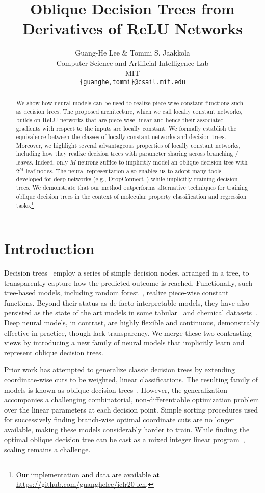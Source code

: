 \documentclass{article} \usepackage{iclr2020_conference,times}
\title{Oblique Decision Trees from Derivatives of ReLU Networks}
\author{Guang-He Lee \& Tommi S. Jaakkola \\
Computer Science and Artificial Intelligence Lab\\
MIT\\
\texttt{\{guanghe,tommi\}@csail.mit.edu} \\
}
\newcommand{\camera}[1]{\textcolor{black}{#1}}
\begin{document}
\maketitle

\begin{abstract}
We show how neural models can be used to realize piece-wise constant functions such as decision trees. The proposed architecture, which we call locally constant networks, builds on ReLU networks that are piece-wise linear and hence their associated gradients with respect to the inputs are locally constant. We formally establish the equivalence between the classes of locally constant networks and decision trees. Moreover, we highlight several advantageous properties of locally constant networks, including how they realize decision trees with parameter sharing across branching / leaves. Indeed, only $M$ neurons suffice to implicitly model an oblique decision tree with $2^M$ leaf nodes. The neural representation also enables us to adopt many tools developed for deep networks (e.g., DropConnect~\citep{wan2013regularization}) while implicitly training decision trees. We demonstrate that our method outperforms alternative techniques for training oblique decision trees in the context of molecular property classification and regression tasks.\footnote{\camera{Our implementation and data are available at \url{https://github.com/guanghelee/iclr20-lcn}.}}
\end{abstract}

%
 \section{Introduction}

Decision trees~\citep{cart84} employ a series of simple decision nodes, arranged in a tree, to transparently capture how the predicted outcome is reached. Functionally, such tree-based models, including random forest~\citep{breiman2001random}, realize piece-wise constant functions. Beyond their status as de facto interpretable models, they have also persisted as the state of the art models in some tabular~\citep{sandulescu2016predicting} and chemical datasets~\citep{wu2018moleculenet}. Deep neural models, in contrast, are highly flexible and continuous, demonstrably effective in practice, though lack transparency. We merge these two contrasting views by introducing a new family of neural models that implicitly learn and represent oblique decision trees. 

Prior work has attempted to generalize classic decision trees by extending coordinate-wise cuts to be weighted, linear classifications. The resulting family of models is known as oblique decision trees~\citep{murthy1993oc1}. However, the generalization accompanies a challenging combinatorial, non-differentiable optimization problem over the linear parameters at each decision point. Simple sorting procedures used for successively finding branch-wise optimal coordinate cuts are no longer available, making these models considerably harder to train. While finding the optimal oblique decision tree can be cast as a mixed integer linear program~\citep{bertsimas2017optimal}, scaling remains a challenge.  
\end{document}
